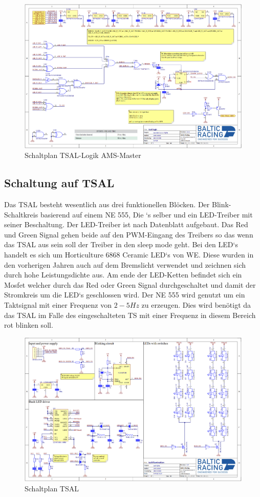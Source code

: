 \begin{figure}
	\centering
	\includegraphics[width=1\linewidth]{"bilder/TSAL Logik AMS Master"}
	\caption{Schaltplan \ac{TSAL}-Logik \ac{AMS}-Master}
	\label{fig:tsal-logik-ams-master}
\end{figure}

\FloatBarrier
\subsection{Schaltung auf \ac{TSAL}}

Das \ac{TSAL} besteht wesentlich aus drei funktionellen Blöcken. Der Blink-Schaltkreis basierend auf einem NE 555, Die `s selber und ein \ac{LED}-Treiber mit seiner Beschaltung. Der \ac{LED}-Treiber ist nach Datenblatt aufgebaut. Das Red und Green Signal gehen beide auf den \ac{PWM}-Eingang des Treibers so das wenn das \ac{TSAL} aus sein soll der Treiber in den sleep mode geht. Bei den \ac{LED}`s handelt es sich um Horticulture 6868 Ceramic \ac{LED}`s von \ac{WE}. Diese wurden in den vorherigen Jahren auch auf dem Bremslicht verwendet und zeichnen sich durch hohe Leistungsdichte aus. Am ende der \ac{LED}-Ketten befindet sich ein Mosfet welcher durch das Red oder Green Signal durchgeschaltet und damit der Stromkreis um die \ac{LED}`s geschlossen wird. Der NE 555 wird genutzt um ein Taktsignal mit einer Frequenz von \ensuremath{2-5 Hz} zu erzeugen. Dies wird benötigt da das \ac{TSAL} im Falle des eingeschalteten \ac{TS} mit einer Frequenz in diesem Bereich rot blinken soll.

\begin{figure}
	\centering
	\includegraphics[width=1\linewidth]{"bilder/Tsal Schematic"}
	\caption{Schaltplan \ac{TSAL}}
	\label{fig:tsal-schematic}
\end{figure}

\FloatBarrier